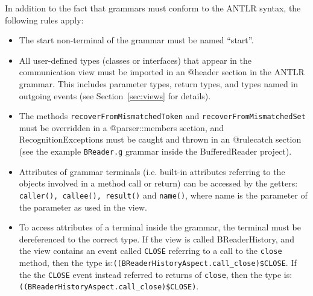 \documentclass{article}
\begin{document}
In addition to the fact that grammars must conform to the ANTLR syntax,  the following rules apply:
\begin{itemize}
\item The start non-terminal of the grammar must be named ``start''.
\item All user-defined types (classes or interfaces) that appear in the communication view must be imported in an @header section in the ANTLR grammar.  This includes parameter types, return types, and types named in outgoing events (see Section~\ref{sec:views} for details).
\item The methods \lstinline+recoverFromMismatchedToken+ and \lstinline+recoverFromMismatchedSet+ must be overridden in a @parser::members section, and RecognitionExceptions must be caught and thrown in an @rulecatch section (see the example \lstinline+BReader.g+ grammar inside the BufferedReader project).
\item Attributes of grammar terminals (i.e. built-in attributes referring to the objects involved in a method call or return) can be accessed by the getters: \lstinline+caller(), callee(), result()+ and \lstinline+name()+, where name is the parameter of the parameter as used in the view.
\item To access attributes of a terminal inside the grammar,  the terminal must be dereferenced to the correct type.  If the view is called BReaderHistory, and the view contains an event called \lstinline+CLOSE+ referring to a call to the \lstinline+close+ method, then the type is:\lstinline+((BReaderHistoryAspect.call_close)$CLOSE+. If the the \lstinline+CLOSE+ event instead referred to returns of \lstinline+close+, then the type is: \lstinline+((BReaderHistoryAspect.call_close)$CLOSE)+.
\end{itemize}
\end{document}
